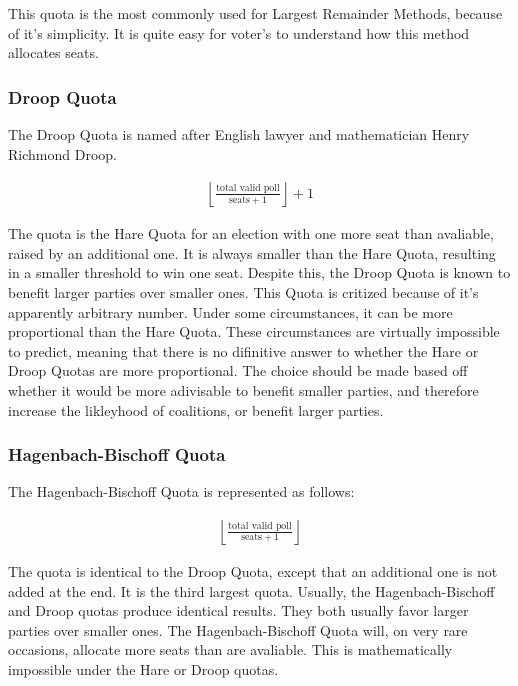 \documentclass{article}
\begin{document}
    This quota is the most commonly used for Largest Remainder Methods, because of it's simplicity. It is quite easy for voter's to understand how this method allocates seats.

    \subsubsection{Droop Quota}

    The Droop Quota is named after English lawyer and mathematician Henry Richmond Droop. 

    \begin{align}
        \left \lfloor \frac{\text{total valid poll}}{\text{seats} + 1} \right \rfloor + 1
    \end{align}

    The quota is the Hare Quota for an election with one more seat than avaliable, raised by an additional one. It is always smaller than the Hare Quota, resulting in a smaller threshold to win one seat. Despite this, the Droop Quota is known to benefit larger parties over smaller ones. This Quota is critized because of it's apparently arbitrary number. Under some circumstances, it can be more proportional than the Hare Quota. These circumstances are virtually impossible to predict, meaning that there is no difinitive answer to whether the Hare or Droop Quotas are more proportional. The choice should be made based off whether it would be more adivisable to benefit smaller parties, and therefore increase the likleyhood of coalitions, or benefit larger parties.

    \subsubsection{Hagenbach-Bischoff Quota}

    The Hagenbach-Bischoff Quota is represented as follows:

    \begin{align}
        \left \lfloor \frac{\text{total valid poll}}{\text{seats} + 1} \right \rfloor
    \end{align}

    The quota is identical to the Droop Quota, except that an additional one is not added at the end. It is the third largest quota. Usually, the Hagenbach-Bischoff and Droop quotas produce identical results. They both usually favor larger parties over smaller ones. The Hagenbach-Bischoff Quota will, on very rare occasions, allocate more seats than are avaliable. This is mathematically impossible under the Hare or Droop quotas.\\
    
\end{document}
